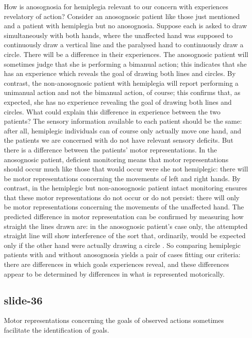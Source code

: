 \documentclass[12pt,\papersize]{extarticle}
\begin{document}
How is anosognosia for hemiplegia relevant to our concern with experiences revelatory of action?
Consider an anosognosic patient like those just mentioned and a patient with hemiplegia but no
anosognosia. Suppose each is asked to draw simultaneously with both hands, where the unaffected hand
was supposed to continuously draw a vertical line and the paralysed hand to continuously draw a
circle. There will be a difference in their experiences.
The anosognosic patient will sometimes judge that she is performing a bimanual action; this indicates that she has an experience which reveals the goal of drawing both lines and circles.
By contrast, the non-anosognosic patient with hemiplegia will report performing a unimanual action
and not the bimanual action, of course; this confirms that, as expected, she has no experience
revealing the goal of drawing both lines and circles. What could explain this difference in
experience between the two patients? The sensory information available to each patient should be the
same: after all, hemiplegic individuals can of course only actually move one hand, and the patients
we are concerned with do not have relevant sensory deficits. But there is a difference between the
patients' motor representations. In the anosognosic patient, deficient monitoring means that motor
representations should occur much like those that would occur were she not hemiplegic: there will be
motor representations concerning the movements of left and right hands. By contrast, in the
hemiplegic but non-anosognosic patient intact monitoring ensures that these motor representations do
not occur or do not persist: there will only be motor representations concerning the movements of
the unaffected hand. The predicted difference in motor representation can be confirmed by measuring
how straight the lines drawn are: in the anosognosic patient's case only, the attempted straight
line will show interference of the sort that, ordinarily, would be expected only if the other hand
were actually drawing a circle \citep{garbarini:2012_moving}. So comparing hemiplegic patients with
and without anosognosia yields a pair of cases fitting our criteria: there are differences in which
goals experiences reveal, and these differences appear to be determined by differences in what is
represented motorically.

\subsection{slide-36}
Motor representations concerning the goals of observed actions sometimes facilitate the identification of goals.
\end{document}
